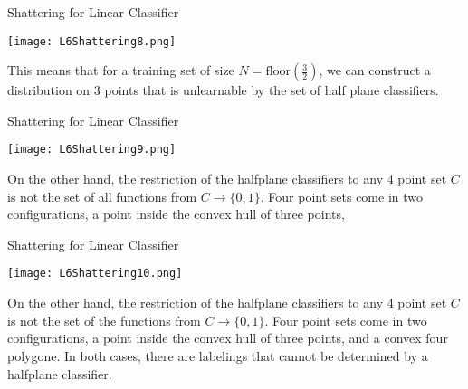 \documentclass[10pt, table, dvipsnames, handout]{beamer}
\begin{document}
\begin{frame}[fragile]{Shattering for Linear Classifier}
  \begin{minipage}[t][0.6\textheight][t]{\textwidth}
	\centering \texttt{[image: L6Shattering8.png]} 
  \end{minipage}
  \vfill
  \begin{minipage}[t][0.4\textheight][t]{\textwidth}
This means that for a training set of size $N = \text{floor}(\frac32)$, we can construct a distribution on 3 points that is unlearnable by the set of half plane classifiers.  

\end{minipage}

\end{frame}





\begin{frame}[fragile]{Shattering for Linear Classifier}
  \begin{minipage}[t][0.6\textheight][t]{\textwidth}
	\centering \texttt{[image: L6Shattering9.png]} 
  \end{minipage}
  \vfill
  \begin{minipage}[t][0.4\textheight][t]{\textwidth}
On the other hand, the restriction of the halfplane classifiers to any 4 point set $C$ is not the set of all functions from $C\to \{0,1\}$. \pause Four point sets come in two configurations, a point inside the convex hull of three points, 

\end{minipage}

\end{frame}




\begin{frame}[fragile]{Shattering for Linear Classifier}
  \begin{minipage}[t][0.6\textheight][t]{\textwidth}
	\centering \texttt{[image: L6Shattering10.png]} 
  \end{minipage}
  \vfill
  \begin{minipage}[t][0.4\textheight][t]{\textwidth}
On the other hand, the restriction of the halfplane classifiers to any 4 point set $C$ is not the set of the functions  from $C\to \{0,1\}$. Four point sets come in two configurations, a point inside the convex hull of three points, and a convex four polygone. \pause In both cases, there are labelings that cannot be determined by a halfplane classifier. 
\end{minipage}

\end{frame}
\end{document}

